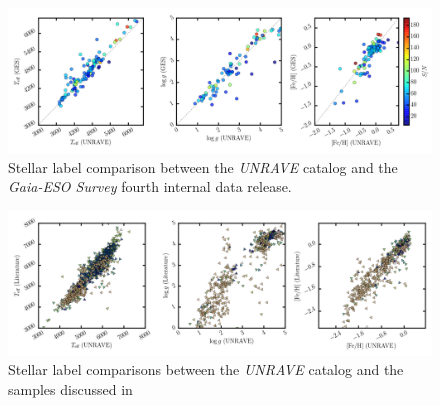 \documentclass[preprint,trackchanges]{aastex}
\newcommand{\project}[1]{\textsl{#1}}
\begin{document}
\begin{figure}[p]
\includegraphics[width=\textwidth]{figures/ges-comparison.png}
\caption{Stellar label comparison between the \project{UNRAVE} catalog and the \project{Gaia-ESO Survey} fourth internal data release.\label{fig:ges-dr4-comparison}}
\end{figure}

\begin{figure}[p]
\includegraphics[width=\textwidth]{figures/literature-comparison.png}
\caption{Stellar label comparisons between the \project{UNRAVE} catalog and the samples discussed in \citep{Kordopatis_2013}}
\end{figure}
\end{document}
